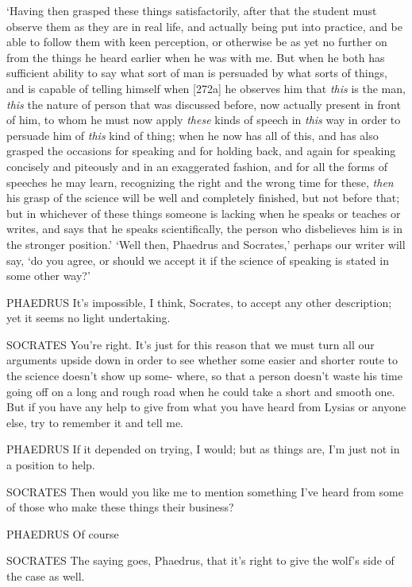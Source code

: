 ‘Having then grasped these things satisfactorily, after that 
the student must observe them as they are in real life, and actually
being put into practice, and be able to follow them with keen
perception, or otherwise be as yet no further on from the things he
heard earlier when he was with me. But when he both has sufficient
ability to say what sort of man is persuaded by what sorts of things,
and is capable of telling himself when {[}272a{]} he observes him that
{\em this} is the man, {\em this} the nature of person that was
discussed before, now actually present in front of him, to whom he must
now apply {\em these} kinds of speech in {\em this} way in order to
persuade him of {\em this} kind of thing; when he now has all of this,
and has also grasped the occasions for speaking  and for holding
back, and again for speaking concisely and piteously and in an
exaggerated fashion, and for all the forms of speeches he may learn,
recognizing the right and the wrong time for these, {\em then} his grasp
of the science will be well and completely finished, but not before
that; but in whichever of  these things someone is lacking when
he speaks or teaches or writes, and says that he speaks scientifically,
the person who disbelieves him is in the stronger position.' ‘Well then,
Phaedrus and Socrates,' perhaps our writer will say, ‘do you agree, or
should we accept it if the science of speaking is stated in some other
way?'

 PHAEDRUS It's impossible, I think, Socrates, to accept any
other description; yet it seems no light undertaking.

SOCRATES You're right. It's just for this reason that we must turn all
our arguments upside down in order to see whether some easier and
shorter route to the science doesn't show up some-  where, so
that a person doesn't waste his time going off on a long and rough road
when he could take a short and smooth one. But if you have any help to
give from what you have heard from Lysias or anyone else, try to
remember it and tell me.

PHAEDRUS If it depended on trying, I would; but as things are, 
I'm just not in a position to help.

SOCRATES Then would you like me to mention something I've heard from
some of those who make these things their business?

PHAEDRUS Of course

SOCRATES The saying goes, Phaedrus, that it's right to give the
 wolf's side of the case as well.

